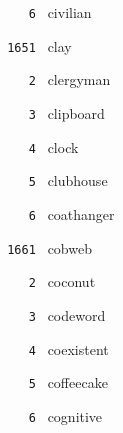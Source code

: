 \documentclass[11pt]{article}
\begin{document}
\begin{multicols}{6}
\noindent \texttt{ \ \ \ 6 } civilian  \par
\vspace{3mm}
\noindent \texttt{ 1651 } clay  \par
\noindent \texttt{ \ \ \ 2 } clergyman  \par
\noindent \texttt{ \ \ \ 3 } clipboard  \par
\noindent \texttt{ \ \ \ 4 } clock  \par
\noindent \texttt{ \ \ \ 5 } clubhouse  \par
\noindent \texttt{ \ \ \ 6 } coathanger  \par
\vspace{3mm}
\noindent \texttt{ 1661 } cobweb  \par
\noindent \texttt{ \ \ \ 2 } coconut  \par
\noindent \texttt{ \ \ \ 3 } codeword  \par
\noindent \texttt{ \ \ \ 4 } coexistent  \par
\noindent \texttt{ \ \ \ 5 } coffeecake  \par
\noindent \texttt{ \ \ \ 6 } cognitive  \par
\end{multicols}
\end{document}
